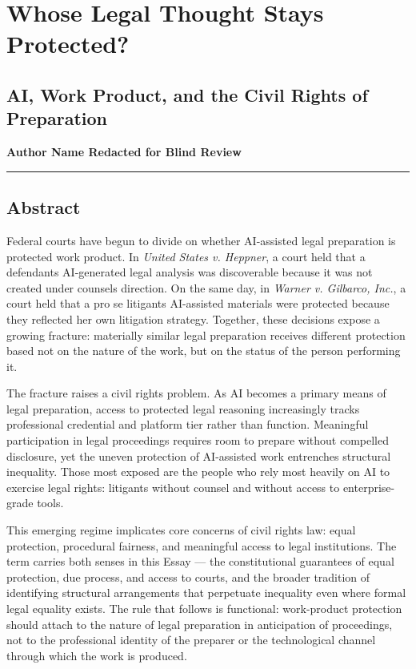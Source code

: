 \documentclass[
  12pt,
]{article}
\author{}
\date{}
\begin{document}
\section{Whose Legal Thought Stays
Protected?}\label{whose-legal-thought-stays-protected}

\subsection{AI, Work Product, and the Civil Rights of
Preparation}\label{ai-work-product-and-the-civil-rights-of-preparation}

\textbf{Author Name Redacted for Blind Review}

\begin{center}\rule{0.5\linewidth}{0.5pt}\end{center}

\subsection{Abstract}\label{abstract}

Federal courts have begun to divide on whether AI-assisted legal
preparation is protected work product. In \emph{United States v.
Heppner}, a court held that a defendant\textquotesingle s AI-generated
legal analysis was discoverable because it was not created under
counsel\textquotesingle s direction. On the same day, in \emph{Warner v.
Gilbarco, Inc.}, a court held that a pro se litigant\textquotesingle s
AI-assisted materials were protected because they reflected her own
litigation strategy. Together, these decisions expose a growing
fracture: materially similar legal preparation receives different
protection based not on the nature of the work, but on the status of the
person performing it.

The fracture raises a civil rights problem. As AI becomes a primary
means of legal preparation, access to protected legal reasoning
increasingly tracks professional credential and platform tier rather
than function. Meaningful participation in legal proceedings requires
room to prepare without compelled disclosure, yet the uneven protection
of AI-assisted work entrenches structural inequality. Those most exposed
are the people who rely most heavily on AI to exercise legal rights:
litigants without counsel and without access to enterprise-grade tools.

This emerging regime implicates core concerns of civil rights law: equal
protection, procedural fairness, and meaningful access to legal
institutions. The term carries both senses in this Essay --- the
constitutional guarantees of equal protection, due process, and access
to courts, and the broader tradition of identifying structural
arrangements that perpetuate inequality even where formal legal equality
exists. The rule that follows is functional: work-product protection
should attach to the nature of legal preparation in anticipation of
proceedings, not to the professional identity of the preparer or the
technological channel through which the work is produced.
\end{document}
